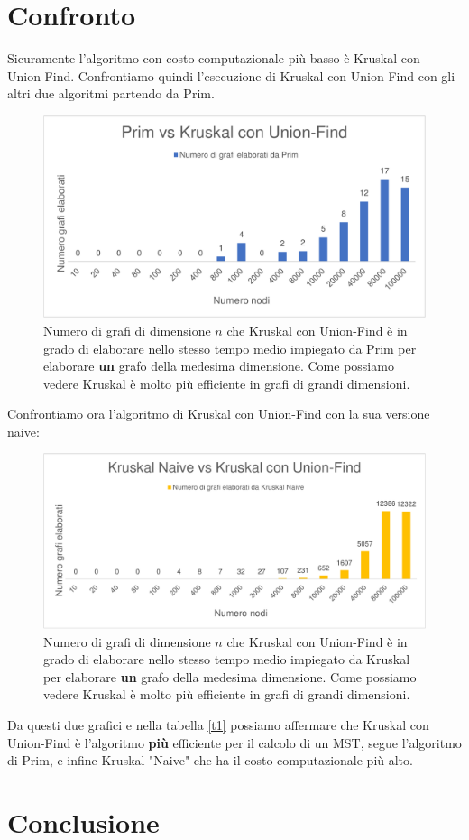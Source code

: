 \section{Confronto}
Sicuramente l'algoritmo con costo computazionale più basso è Kruskal con Union-Find.
Confrontiamo quindi l'esecuzione di Kruskal con Union-Find con gli altri due algoritmi partendo da Prim. 
\begin{figure}[H]
\centering
\includegraphics[scale=0.5]{grafici/primvskruskaluf.pdf}
\caption{Numero di grafi di dimensione $n$ che Kruskal con Union-Find è in grado di elaborare nello stesso tempo medio impiegato da Prim per elaborare \textbf{un} grafo  della medesima dimensione. Come possiamo vedere Kruskal è molto più efficiente in grafi di grandi dimensioni.}
\end{figure}
Confrontiamo ora l'algoritmo di Kruskal con Union-Find con la sua versione naive:
\begin{figure}[H]
\centering
\includegraphics[scale=0.5]{grafici/kruskalvskruskaluf.pdf}
\caption{Numero di grafi di dimensione $n$ che Kruskal con Union-Find è in grado di elaborare nello stesso tempo medio impiegato da Kruskal per elaborare \textbf{un} grafo della medesima dimensione. Come possiamo vedere Kruskal è molto più efficiente in grafi di grandi dimensioni.}
\end{figure}
Da questi due grafici e nella tabella \ref{t1} possiamo affermare che Kruskal con Union-Find è l'algoritmo \textbf{più} efficiente per il calcolo di un MST, segue l'algoritmo di Prim, e infine Kruskal "Naive" che ha il costo computazionale più alto.
\section{Conclusione}
